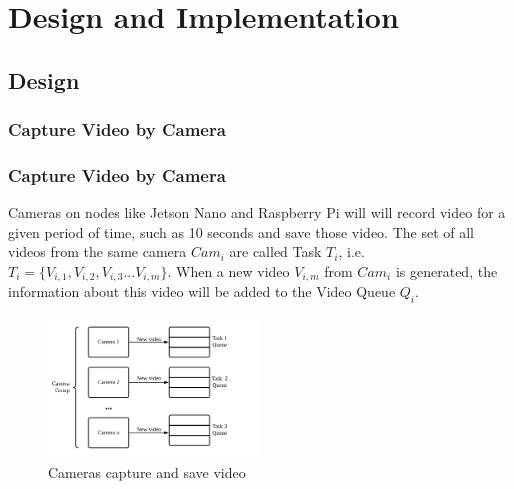 \documentclass{beamer}
\begin{document}
\section{Design and Implementation}
\subsection{Design}
\subsubsection{Capture Video by Camera}
\begin{frame}
    \frametitle{Capture Video by Camera}
    Cameras on nodes like Jetson Nano and Raspberry Pi will will record video for a given period of time, such as 10 seconds and save those video. The set of all videos from the same camera $Cam_i$ are called Task $T _i$, i.e. $T_i=\{V_{i,1},V_{i,2},V_{i,3}...V_{i,m}\}$. When a new video $V_{i,m}$ from $Cam_i$ is generated, the information about this video will be added to the Video Queue $Q_i$.
    \begin{figure}[H]
        \centering
        \includegraphics[width=0.5\textwidth]{img/report2.png}
        \caption{Cameras capture and save video}
        \label{img2} 
    \end{figure}
\end{frame}
\end{document}
